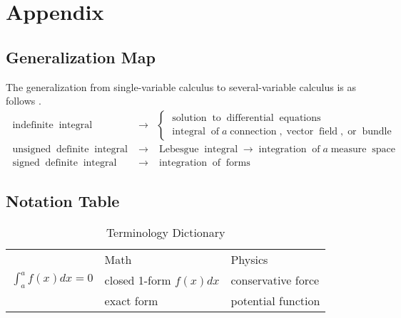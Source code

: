 \documentclass{article}
\newcommand{\tmop}[1]{\ensuremath{\operatorname{#1}}}
\begin{document}
{}

\section{Appendix}

\subsection{Generalization Map}

The generalization from single-variable calculus to several-variable calculus
is as follows {\cite{tao2007differential}}.
\begin{eqnarray*}
  \tmop{indefinite} \tmop{integral} & \longrightarrow &
  \left\{\begin{array}{l}
    \tmop{solution} \tmop{to} \tmop{differential} \tmop{equations}\\
    \tmop{integral} \tmop{of} a \tmop{connection}, \tmop{vector} \tmop{field},
    \tmop{or} \tmop{bundle}
  \end{array}\right.\\
  \tmop{unsigned} \tmop{definite} \tmop{integral} & \longrightarrow &
  \tmop{Lebesgue} \tmop{integral} \longrightarrow \tmop{integration} \tmop{of}
  a \tmop{measure} \tmop{space}\\
  \tmop{signed} \tmop{definite} \tmop{integral} & \longrightarrow &
  \tmop{integration} \tmop{of} \tmop{forms}
\end{eqnarray*}

\subsection{Notation Table}

\begin{table}[h]
  \begin{tabular}{lll}
    & Math & Physics\\
    $\int^a_a f (x) d x = 0$ & closed 1-form $f (x) d x$ & conservative
    force\\
    & exact form & potential function
  \end{tabular}
  \caption{Terminology Dictionary}
\end{table}
\end{document}
